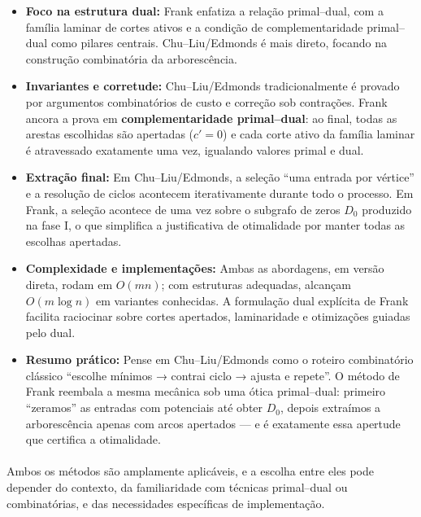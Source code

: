 \documentclass[12pt,a4paper]{article}
\def\emph#1{#1}%
\begin{document}
\begin{itemize}
    \item \textbf{Foco na estrutura dual:} \emph{Frank} enfatiza a relação primal–dual, com a família laminar de cortes ativos e a condição de complementaridade primal–dual como pilares centrais. \emph{Chu–Liu/Edmonds} é mais direto, focando na construção combinatória da arborescência.

    \item \textbf{Invariantes e corretude:} \emph{Chu–Liu/Edmonds} tradicionalmente é provado por argumentos combinatórios de custo e correção sob contrações. \emph{Frank} ancora a prova em \textbf{complementaridade primal–dual}: ao final, todas as arestas escolhidas são \emph{apertadas} (\(c'=0\)) e cada corte ativo da família laminar é atravessado exatamente uma vez, igualando valores primal e dual.

    \item \textbf{Extração final:} Em \emph{Chu–Liu/Edmonds}, a seleção “uma entrada por vértice” e a resolução de ciclos acontecem iterativamente durante todo o processo. Em \emph{Frank}, a seleção acontece de uma vez sobre o subgrafo de zeros \(D_0\) produzido na fase I, o que simplifica a justificativa de otimalidade por manter todas as escolhas \emph{apertadas}.

    \item \textbf{Complexidade e implementações:} Ambas as abordagens, em versão direta, rodam em \(O(mn)\); com estruturas adequadas, alcançam \(O(m\log n)\) em variantes conhecidas. A formulação dual explícita de \emph{Frank} facilita raciocinar sobre \emph{cortes apertados}, laminaridade e otimizações guiadas pelo dual.

    \item \textbf{Resumo prático:} Pense em \emph{Chu–Liu/Edmonds} como o roteiro combinatório clássico “escolhe mínimos → contrai ciclo → ajusta e repete”. O método de \emph{Frank} reembala a mesma mecânica sob uma ótica \emph{primal–dual}: primeiro “zeramos” as entradas com potenciais até obter \(D_0\), depois extraímos a arborescência apenas com arcos apertados — e é exatamente essa apertude que certifica a otimalidade.
\end{itemize}

\paragraph{}
Ambos os métodos são amplamente aplicáveis, e a escolha entre eles pode depender do contexto, da familiaridade com técnicas primal–dual ou combinatórias, e das necessidades específicas de implementação.
\end{document}
